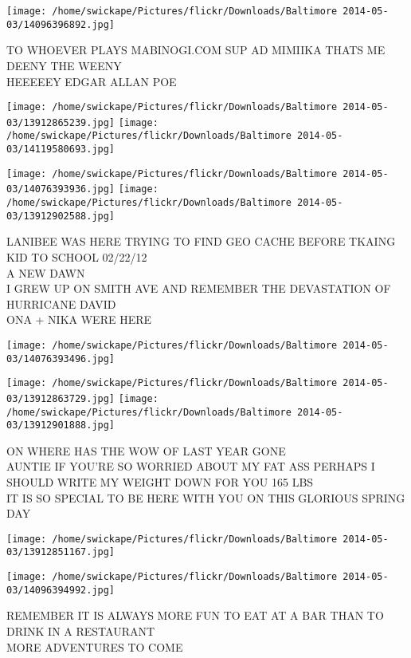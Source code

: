 \documentclass[10pt,letterpaper]{article}
\begin{document}
\vspace{0.25in}
\texttt{[image: /home/swickape/Pictures/flickr/Downloads/Baltimore 2014-05-03/14096396892.jpg]}

TO WHOEVER PLAYS MABINOGI.COM SUP AD MIMIIKA THATS ME\\
DEENY THE WEENY\\
HEEEEEY EDGAR ALLAN POE
\pagebreak

\texttt{[image: /home/swickape/Pictures/flickr/Downloads/Baltimore 2014-05-03/13912865239.jpg]}
\texttt{[image: /home/swickape/Pictures/flickr/Downloads/Baltimore 2014-05-03/14119580693.jpg]}

\texttt{[image: /home/swickape/Pictures/flickr/Downloads/Baltimore 2014-05-03/14076393936.jpg]}
\texttt{[image: /home/swickape/Pictures/flickr/Downloads/Baltimore 2014-05-03/13912902588.jpg]}

LANIBEE WAS HERE TRYING TO FIND GEO CACHE BEFORE TKAING KID TO SCHOOL 02/22/12\\
A NEW DAWN\\
I GREW UP ON SMITH AVE AND REMEMBER THE DEVASTATION OF HURRICANE DAVID\\
ONA + NIKA WERE HERE
\pagebreak

\texttt{[image: /home/swickape/Pictures/flickr/Downloads/Baltimore 2014-05-03/14076393496.jpg]}

\vspace{0.25in}
\texttt{[image: /home/swickape/Pictures/flickr/Downloads/Baltimore 2014-05-03/13912863729.jpg]}
\texttt{[image: /home/swickape/Pictures/flickr/Downloads/Baltimore 2014-05-03/13912901888.jpg]}

ON WHERE HAS THE WOW OF LAST YEAR GONE\\
AUNTIE IF YOU'RE SO WORRIED ABOUT MY FAT ASS PERHAPS I SHOULD WRITE MY WEIGHT DOWN  FOR YOU 165 LBS\\
IT IS SO SPECIAL TO BE HERE WITH YOU ON THIS GLORIOUS SPRING DAY
\pagebreak

\texttt{[image: /home/swickape/Pictures/flickr/Downloads/Baltimore 2014-05-03/13912851167.jpg]}

\vspace{0.25in}
\texttt{[image: /home/swickape/Pictures/flickr/Downloads/Baltimore 2014-05-03/14096394992.jpg]}

REMEMBER IT IS ALWAYS MORE FUN TO EAT AT A BAR THAN TO DRINK IN A RESTAURANT\\
MORE ADVENTURES TO COME
\pagebreak
\end{document}
